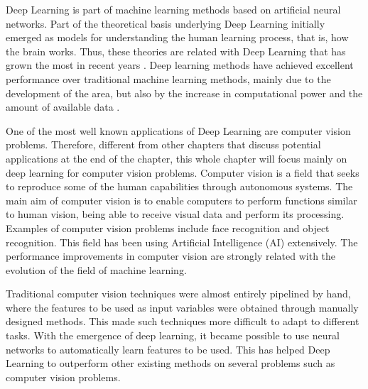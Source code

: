  Deep Learning is part of machine learning methods based on artificial neural networks. %
 Part of the theoretical basis underlying Deep Learning  initially emerged as models for understanding the human learning process, that is, how the brain works. Thus, these theories are related with Deep Learning  that has grown the most in recent years \cite{goodfellow2016}. Deep learning methods have achieved excellent performance over traditional machine learning methods, mainly due to the development of the area, but also by the increase in computational power and the amount of available data \cite{geron2019}. 

One of the most well known applications of Deep Learning are computer vision problems. Therefore, different from other chapters that discuss potential applications at the end of the chapter, this whole chapter will focus mainly on deep learning for computer vision problems. Computer vision is a field that seeks to reproduce some of the human capabilities through autonomous systems. The main aim of computer vision is to enable computers to perform functions similar to human vision, being able to receive visual data and perform its processing. Examples of computer vision problems include face recognition and object recognition. This field has been using Artificial Intelligence (AI) extensively. The performance improvements in computer vision are strongly related with the evolution of the field of machine learning.

Traditional computer vision techniques were almost entirely pipelined by hand, where the features to be used as input variables were obtained through manually designed methods. This made such techniques more difficult to adapt to different tasks. With the emergence of deep learning, it became possible to use neural networks to automatically learn features to be used. This has helped Deep Learning to outperform other existing methods on several problems such as computer vision problems.

%

